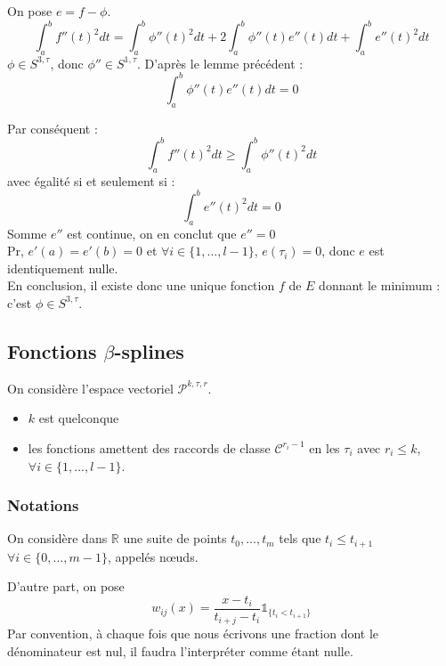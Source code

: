 
\begin{dem}
On pose $e=f-\phi$.
\[\int_a^b f''(t)^2dt = \int_a^b \phi''(t)^2 dt + 2\int_a^b \phi''(t)e''(t) dt + \int_a^b e''(t)^2 dt\]
$\phi \in S^{3,\tau}$, donc $\phi''\in S^{1,\tau}$. D'après le lemme précédent :
\[\int_a^b \phi''(t) e''(t) dt = 0\]

Par conséquent :
	\[\int_a^b f''(t)^2 dt \geq \int_a^b \phi''(t)^2 dt\]
avec égalité si et seulement si :
\[\int_a^b e''(t)^2 dt = 0\]
Somme $e''$ est continue, on en conclut que $e''=0$\\
Pr, $e'(a)=e'(b)=0$ et $\forall i\in \{1,...,l-1\}$, $e(\tau_i)=0$, donc $e$ est identiquement nulle.\\
En conclusion, il existe donc une unique fonction $f$ de $E$ donnant le minimum : c'est $\phi \in S^{3,\tau}$.
\end{dem}

\subsection[Fonctions beta-splines]{Fonctions $\beta$-splines}

On considère l'espace vectoriel $\mathcal{P}^{k,\tau,r}$.
\begin{itemize}
	\item $k$ est quelconque
	\item les fonctions amettent des raccords de classe $\mathcal{C}^{r_i-1}$ en les $\tau_i$ avec $r_i\leq k$, $\forall i\in \{1,...,l-1\}$.
\end{itemize}

\subsubsection{Notations}
On considère dans $\mathbb{R}$ une suite de points $t_0,...,t_m$ tels que $t_i\leq t_{i+1}$ $\forall i\in\{0,...,m-1\}$, appelés n\oe uds.


D'autre part, on pose \[w_{ij}(x)=\frac{x-t_i}{t_{i+j}-t_i} \mathds{1}_{\{t_i<t_{i+1}\}}\]
Par convention, à chaque fois que nous écrivons une fraction dont le dénominateur est nul, il faudra l'interpréter comme étant nulle.

